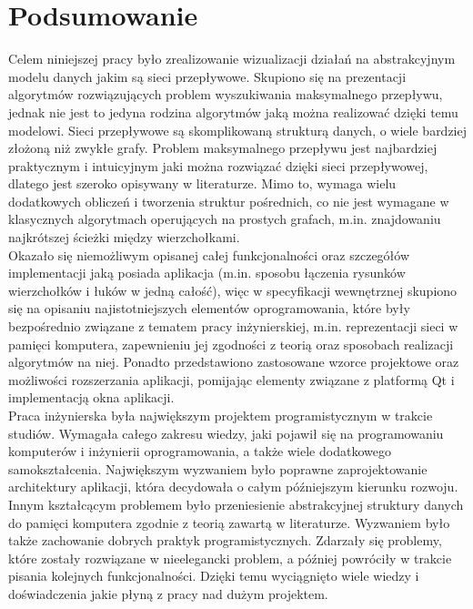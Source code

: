 \chapter{Podsumowanie}
Celem niniejszej pracy było zrealizowanie wizualizacji działań na abstrakcyjnym modelu danych jakim są sieci przepływowe. Skupiono się na prezentacji algorytmów rozwiązujących problem wyszukiwania maksymalnego przepływu, jednak nie jest to jedyna rodzina algorytmów jaką można realizować dzięki temu modelowi. Sieci przepływowe są skomplikowaną strukturą danych, o wiele bardziej złożoną niż zwykłe grafy. Problem maksymalnego przepływu jest najbardziej praktycznym i intuicyjnym jaki można rozwiązać dzięki sieci przepływowej, dlatego jest szeroko opisywany w literaturze. Mimo to, wymaga wielu dodatkowych obliczeń i tworzenia struktur pośrednich, co nie jest wymagane w klasycznych algorytmach operujących na prostych grafach, m.in. znajdowaniu najkrótszej ścieżki między wierzchołkami.\\\indent
Okazało się niemożliwym opisanej całej funkcjonalności oraz szczegółów implementacji jaką posiada aplikacja (m.in. sposobu łączenia rysunków wierzchołków i łuków w jedną całość), więc w specyfikacji wewnętrznej skupiono się na opisaniu najistotniejszych elementów oprogramowania, które były bezpośrednio związane z tematem pracy inżynierskiej, m.in. reprezentacji sieci w pamięci komputera, zapewnieniu jej zgodności z teorią oraz sposobach realizacji algorytmów na niej. Ponadto przedstawiono zastosowane wzorce projektowe oraz możliwości rozszerzania aplikacji, pomijając elementy związane z platformą Qt i implementacją okna aplikacji.\\\indent
Praca inżynierska była największym projektem programistycznym w trakcie studiów. Wymagała całego zakresu wiedzy, jaki pojawił się na programowaniu komputerów i inżynierii oprogramowania, a także wiele dodatkowego samokształcenia. Największym wyzwaniem było poprawne zaprojektowanie architektury aplikacji, która decydowała o całym późniejszym kierunku rozwoju. Innym kształcącym problemem było przeniesienie abstrakcyjnej struktury danych do pamięci komputera zgodnie z teorią zawartą w literaturze. Wyzwaniem było także zachowanie dobrych praktyk programistycznych. Zdarzały się problemy, które zostały rozwiązane w nieelegancki problem, a później powróciły w trakcie pisania kolejnych funkcjonalności. Dzięki temu wyciągnięto wiele wiedzy i doświadczenia jakie płyną z pracy nad dużym projektem.\\\indent
